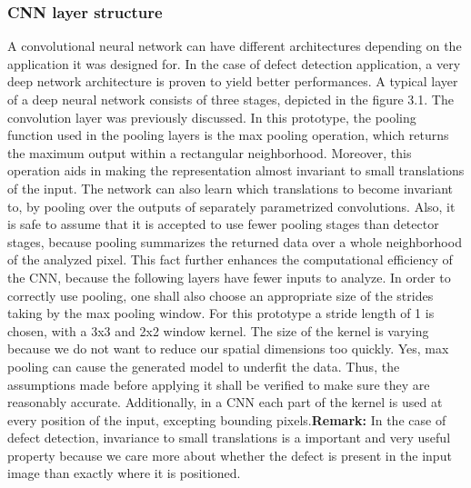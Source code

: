 \documentclass[12pt,a4paper,twoside]{report}
\begin{document}
\subsubsection{CNN layer structure}
A convolutional neural network can have different architectures depending on the application it was designed for. In the case of defect detection application, a very deep network architecture is proven to yield better performances. A typical layer of a deep neural network consists of three stages, depicted in the figure 3.1. The convolution layer was previously discussed. In this prototype, the pooling function used in the pooling layers is the max pooling operation\cite{article-maxpooling}, which returns the maximum output within a rectangular neighborhood. Moreover, this operation aids in making the representation almost invariant to small translations of the input. The network can also learn which translations to become invariant to, by pooling over the outputs of separately parametrized convolutions. Also, it is safe to assume that it is accepted to use fewer pooling stages than detector stages, because pooling summarizes the returned data over a whole neighborhood of the analyzed pixel. This fact further enhances the computational efficiency of the CNN, because the following layers have fewer inputs to analyze. In order to correctly use pooling, one shall also choose an appropriate size of the strides taking by the max pooling window. For this prototype a stride length of 1 is chosen, with a 3x3 and 2x2 window kernel. The size of the kernel is varying because we do not want to reduce our spatial dimensions too quickly. Yes, max pooling can cause the generated model to underfit the data. Thus, the assumptions made before applying it shall be verified to make sure they are reasonably accurate. Additionally, in a CNN each part of the kernel is used at every position of the input, excepting bounding pixels.\textbf{Remark:} In the case of defect detection, invariance to small translations is a important and very useful property because we care more about whether the defect is present in the input image than exactly where it is positioned. \par
\end{document}
